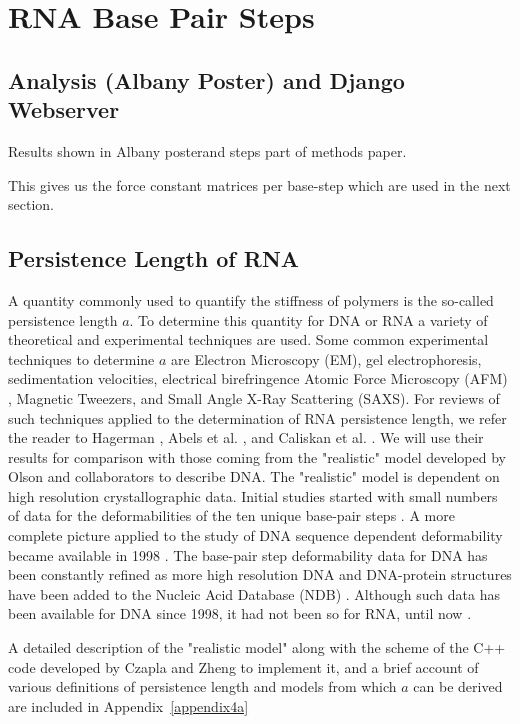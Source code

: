 \chapter{RNA Base Pair Steps}
\label{basepairsteps} 

\section{Analysis (Albany Poster) and Django Webserver}
Results shown in Albany posterand steps part of methods paper.

This gives us the force constant matrices per base-step which are used
in the next section.

\section{Persistence Length of RNA}
A quantity commonly used to  quantify the stiffness of polymers is the
so-called persistence  length $a$. To determine this  quantity for DNA
or RNA a variety of  theoretical and experimental techniques are used.
Some  common experimental  techniques  to determine  $a$ are  Electron
Microscopy   (EM),  gel  electrophoresis,   sedimentation  velocities,
electrical  birefringence  Atomic Force  Microscopy  (AFM) ,  Magnetic
Tweezers,  and Small Angle  X-Ray Scattering  (SAXS).  For  reviews of
such  techniques  applied  to  the determination  of  RNA  persistence
length, we refer the  reader to Hagerman \cite{hagerman1997}, Abels et
al.  \cite{abels2005},  and Caliskan et  al.  \cite{caliskan2005}.  We
will  use their  results for  comparison  with those  coming from  the
"realistic"    model   developed    by    Olson   and    collaborators
\cite{olson1995} to  describe DNA. The "realistic"  model is dependent
on  high resolution  crystallographic data.   Initial  studies started
with small numbers  of data for the deformabilities  of the ten unique
base-pair steps  \cite{olson1995}. A more complete  picture applied to
the study of DNA  sequence dependent deformability became available in
1998 \cite{olson1998}.  The base-pair  step deformability data for DNA
has  been   constantly  refined  as  more  high   resolution  DNA  and
DNA-protein  structures have been  added to  the Nucleic  Acid Database
(NDB)  \cite{balasubramanian2009}.    Although  such  data   has  been
available for  DNA since 1998, it had  not been so for  RNA, until now
\cite{olson2009}.

A detailed description of the  "realistic model" along with the scheme
of the C++  code developed by Czapla and Zheng to  implement it, and a
brief account of various  definitions of persistence length and models
from which $a$ can be derived are included in Appendix~\ref{appendix4a}





